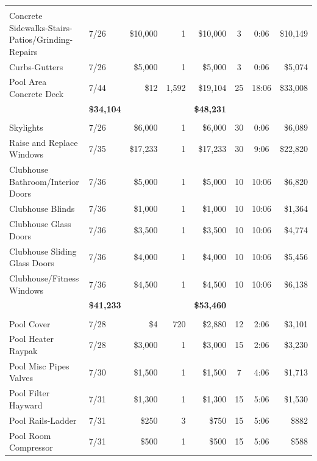\documentclass[11pt,letterpaper]{article}
\begin{document}
\begin{longtable}{p{4.2cm} p{1.6cm} r r r c c r}
\addlinespace[6pt]
\multicolumn{8}{l}{\textbf{Concrete}} \\
\rowcolor{blue!12} Concrete Sidewalks-Stairs-Patios/Grinding-Repairs & 7/26 & \$10,000 & 1 & \$10,000 & 3 & 0:06 & \$10,149 \\
Curbs-Gutters & 7/26 & \$5,000 & 1 & \$5,000 & 3 & 0:06 & \$5,074 \\
\rowcolor{blue!12} Pool Area Concrete Deck & 7/44 & \$12 & 1,592 & \$19,104 & 25 & 18:06 & \$33,008 \\
\addlinespace[1pt] \multicolumn{4}{r}{} & \textbf{\$34,104} & & & \textbf{\$48,231} \\
\addlinespace[6pt]
\multicolumn{8}{l}{\textbf{Doors-Windows}} \\
Skylights & 7/26 & \$6,000 & 1 & \$6,000 & 30 & 0:06 & \$6,089 \\
\rowcolor{blue!12} Raise and Replace Windows & 7/35 & \$17,233 & 1 & \$17,233 & 30 & 9:06 & \$22,820 \\
Clubhouse Bathroom/Interior Doors & 7/36 & \$5,000 & 1 & \$5,000 & 10 & 10:06 & \$6,820 \\
\rowcolor{blue!12} Clubhouse Blinds & 7/36 & \$1,000 & 1 & \$1,000 & 10 & 10:06 & \$1,364 \\
Clubhouse Glass Doors & 7/36 & \$3,500 & 1 & \$3,500 & 10 & 10:06 & \$4,774 \\
\rowcolor{blue!12} Clubhouse Sliding Glass Doors & 7/36 & \$4,000 & 1 & \$4,000 & 10 & 10:06 & \$5,456 \\
Clubhouse/Fitness Windows & 7/36 & \$4,500 & 1 & \$4,500 & 10 & 10:06 & \$6,138 \\
\addlinespace[1pt] \multicolumn{4}{r}{} & \textbf{\$41,233} & & & \textbf{\$53,460} \\
\addlinespace[6pt]
\multicolumn{8}{l}{\textbf{Equipment}} \\
\rowcolor{blue!12} Pool Cover & 7/28 & \$4 & 720 & \$2,880 & 12 & 2:06 & \$3,101 \\
Pool Heater Raypak & 7/28 & \$3,000 & 1 & \$3,000 & 15 & 2:06 & \$3,230 \\
\rowcolor{blue!12} Pool Misc Pipes Valves & 7/30 & \$1,500 & 1 & \$1,500 & 7 & 4:06 & \$1,713 \\
Pool Filter Hayward & 7/31 & \$1,300 & 1 & \$1,300 & 15 & 5:06 & \$1,530 \\
\rowcolor{blue!12} Pool Rails-Ladder & 7/31 & \$250 & 3 & \$750 & 15 & 5:06 & \$882 \\
Pool Room Compressor & 7/31 & \$500 & 1 & \$500 & 15 & 5:06 & \$588 \\

\end{longtable}
\end{document}
